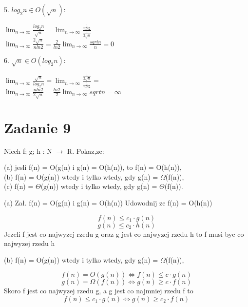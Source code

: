 \documentclass{article}
\newcommand{\xmark}{\ding{55}}
\begin{document}
5. $log_2n \in O(\sqrt{n})$:\\
\begin{center}
$ \lim_{n \to \infty} \frac{log_2n}{\sqrt{n}} = \lim_{n \to \infty} \frac{\frac{1}{nln2}}{\frac{1}{2\sqrt{n}}} = $\\
$\lim_{n \to \infty} \frac{2\sqrt{n}}{nln2} = \frac{2}{ln2} \lim_{n \to \infty} \frac{sqrt{n}}{n} = 0$ \checkmark
\end{center}

6. $\sqrt{n} \in O(log_2n)$:\\
\begin{center}
$ \lim_{n \to \infty} \frac{\sqrt{n}}{log_2n} = \lim_{n \to \infty} \frac{\frac{1}{2\sqrt{n}}}{\frac{1}{nln2}} = $\\
$\lim_{n \to \infty} \frac{nln2}{2\sqrt{n}} = \frac{ln2}{2} \lim_{n \to \infty} sqrt{n} = \infty$ \xmark
\end{center}

\newpage
\section{Zadanie 9}

Niech f; g; h : N $\rightarrow$ R. Pokaz,ze:

\begin{center}
(a) jesli f(n) = O(g(n) i g(n) = O(h(n)), to f(n) = O(h(n)),\\
(b) f(n) = O(g(n)) wtedy i tylko wtedy, gdy g(n) = $\Omega$(f(n)),\\
(c) f(n) = $\Theta$(g(n)) wtedy i tylko wtedy, gdy g(n) = $\Theta$(f(n)).\\
\end{center}

(a) Zał. f(n) = O(g(n) i g(n) = O(h(n))
Udowodnij ze f(n) = O(h(n))

\begin{center}
$$f(n) \leq c_1\cdot g(n)$$
$$ g(n) \leq c_2\cdot h(n) $$
Jezeli f jest co najwyzej rzedu g oraz g jest co najwyzej rzedu h to f musi byc co najwyzej rzedu h
\end{center}

(b) f(n) = O(g(n)) wtedy i tylko wtedy, gdy g(n) = $\Omega$(f(n)),
\begin{center}
    $$f(n) = O(g(n)) \Leftrightarrow f(n) \leq c\cdot g(n)$$
    $$g(n) = \Omega(f(n)) \Leftrightarrow g(n) \geq c\cdot f(n)$$
    Skoro f jest co najwyzej rzedu g, a g jest co najmniej rzedu f to
    $$f(n) \leq c_1\cdot g(n) \Leftrightarrow g(n) \geq c_2\cdot f(n)$$
\end{center}
\end{document}
